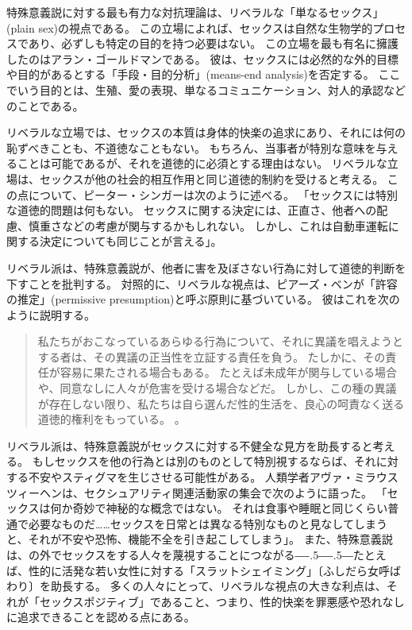 \documentclass[paper=a4,book,openany]{jlreq}
\newcommand{\ig}[1]{}           %
\def\DDASH{―\kern-.5\zw―\kern-.5\zw―} %
\begin{document}
特殊意義説に対する最も有力な対抗理論は、リベラルな「単なるセックス」(plain sex)の視点である。
この立場によれば、セックスは自然な生物学的プロセスであり、必ずしも特定の目的を持つ必要はない。
この立場を最も有名に擁護したのはアラン・ゴールドマンである。
彼は、セックスには必然的な外的目標や目的があるとする「手段・目的分析」(means-end analysis)を否定する。
ここでいう目的とは、生殖、愛の表現、単なるコミュニケーション、対人的承認などのことである\citep{goldman77:_plain_sex}\ig{Alan Goldman}。

リベラルな立場では、セックスの本質は身体的快楽の追求にあり、それには何の恥ずべきことも、不道徳なこともない。
もちろん、当事者が特別な意味を与えることは可能であるが、それを道徳的に必須とする理由はない。
リベラルな立場は、セックスが他の社会的相互作用と同じ道徳的制約を受けると考える。
この点について、ピーター・シンガーは次のように述べる。
「セックスには特別な道徳的問題は何もない。
セックスに関する決定には、正直さ、他者への配慮、慎重さなどの考慮が関与するかもしれない。
しかし、これは自動車運転に関する決定についても同じことが言える」\citep[p.2]{singer79:_pract_ethic}。

リベラル派は、特殊意義説が、他者に害を及ぼさない行為に対して道徳的判断を下すことを批判する。
対照的に、リベラルな視点は、ピアーズ・ベンが「許容の推定」(permissive presumption)と呼ぶ原則に基づいている。
彼はこれを次のように説明する。
\begin{quote}
  私たちがおこなっているあらゆる行為について、それに異議を唱えようとする者は、その異議の正当性を立証する責任を負う。
たしかに、その責任が容易に果たされる場合もある。
たとえば未成年が関与している場合や、同意なしに人々が危害を受ける場合などだ。
しかし、この種の異議が存在しない限り、私たちは自ら選んだ性的生活を、良心の呵責なく送る道徳的権利をもっている。
\citep[p.237]{benn99:_is_sex_moral_special}。
\end{quote}
リベラル派は、特殊意義説がセックスに対する不健全な見方を助長すると考える。
もしセックスを他の行為とは別のものとして特別視するならば、それに対する不安やスティグマを生じさせる可能性がある。
人類学者アヴァ・ミラウスツィーヘンは、セクシュアリティ関連活動家の集会で次のように語った。
「セックスは何か奇妙で神秘的な概念ではない。
それは食事や睡眠と同じくらい普通で必要なものだ……セックスを日常とは異なる特別なものと見なしてしまうと、それが不安や恐怖、機能不全を引き起こしてしまう」\citep{fein13:_why_sex_is}。
また、特殊意義説は、の外でセックスをする人々を蔑視することにつながる{\DDASH}たとえば、性的に活発な若い女性に対する「スラットシェイミング」〔ふしだら女呼ばわり〕を助長する。
多くの人々にとって、リベラルな視点の大きな利点は、それが「セックスポジティブ」であること、つまり、性的快楽を罪悪感や恐れなしに追求できることを認める点にある。
\end{document}

